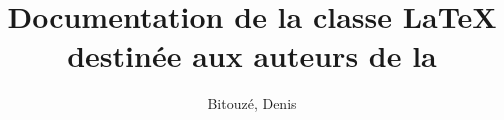 \documentclass{gztarticle}
\begin{document}
\title[short=Documentation \LaTeX{} destinée aux auteurs de la Gazette]{Documentation
  de la classe \LaTeX{} destinée aux auteurs de la \gzt{}}
%
\author[%
affiliation={%
  Université du Littoral Côte d'Opale, Laboratoire de mathématiques pures et
  appliquées%
},%
photo=Denis,%
email=denis.bitouze@lmpa.univ-littoral.fr,%
webpage=http://gte.univ-littoral.fr/members/dbitouze/pub/latex/,%
]{Bitouzé, Denis}
%
\maketitle*
%
\localtableofcontents
%




%
\printindex
%
\printbibliography
\end{document}
